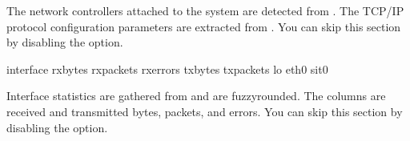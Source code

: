 \documentclass[letterpaper,10pt,english]{sphinxmanual}
\begin{document}
\sphinxAtStartPar
The network controllers attached to the system are detected from . The
TCP/IP protocol configuration parameters are extracted from . You can skip this section by disabling the {\hyperref[\detokenize{mariadb-system-summary:cmdoption-mariadb-system-summary-summarize-network}]{}} option.

\begin{sphinxVerbatim}[commandchars=\\\{\}]
interface rx\PYGZus{}bytes rx\PYGZus{}packets rx\PYGZus{}errors tx\PYGZus{}bytes tx\PYGZus{}packets 
      
lo                                       
eth0                                      
sit0                                                           
\end{sphinxVerbatim}

\sphinxAtStartPar
Interface statistics are gathered from  and are fuzzy\sphinxhyphen{}rounded. The
columns are received and transmitted bytes, packets, and errors.  You can skip
this section by disabling the {\hyperref[\detokenize{mariadb-system-summary:cmdoption-mariadb-system-summary-summarize-network}]{}} option.
\end{document}
